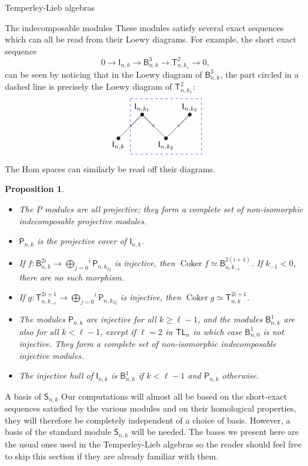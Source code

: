 \documentclass[reqno]{amsart}
\newtheorem{Prop}[Thm]{Proposition}
\newcommand{\tl}[1]{\mathsf{TL}_{#1}}
\newcommand{\ds}[1]{\mathsf S_{#1}}
\newcommand{\dl}[1]{\mathsf I_{#1}}
\newcommand{\dP}[1]{\mathsf P_{#1}}
\newcommand{\T}[2]{\mathsf{T}^{#1}_{#2}}
\newcommand{\B}[2]{\mathsf{B}^{#1}_{#2}}
\DeclareMathOperator{\Coker}{Coker}
\begin{document}
\begin{section}{Temperley-Lieb algebras}
\begin{subsection}{The indecomposable modules}
These modules satisfy several exact sequences which can all be read from their Loewy diagrams. For example, the short exact sequence
$$0 \longrightarrow \dl{n,k} \longrightarrow \B{3}{n,k} \longrightarrow \T{2}{n,k_{1}} \longrightarrow 0,$$
can be seen by noticing that in the Loewy diagram of $\B{3}{n,k}$, the part circled in a dashed line is precisely the Loewy diagram of $\T{2}{n,k_{1}}$:
\begin{equation*}
\begin{tikzpicture}[scale=1/3]
	\filldraw
			(0,0) circle (6pt) node[anchor = north] {$\dl{n,k}$}
		--	(3,3) circle (6pt) node[anchor = south] {$\dl{n,k_{1}}$}
		--	(6,0) circle (6pt) node[anchor = north] {$\dl{n,k_{2}}$}
		--	(9,3) circle (6pt) node[anchor = south] {$\dl{n,k_{3}}$};
	\draw[->] (3,3) -- (1.5,1.5);
	\draw[->] (3,3) -- (4.5,1.5);
	\draw[->] (9,3) -- (7.5,1.5);
	\draw[dashed, blue] (1.5,5) -- (10.5,5) -- (10.5,-2) -- (1.5,-2) -- (1.5,5);
\end{tikzpicture}
\end{equation*}
The Hom spaces can similarly be read off their diagrams.
\begin{Prop}\label{prop:indec.prop}
\begin{itemize}
\item The $P$ modules are all projective; they form a complete set of non-isomorphic indecomposable projective modules.
\item $\dP{n,k}$ is the projective cover of $\dl{n,k}$.
\item If $f:\B{2i}{n,k} \to \overset{i}{\underset{j=0}{\bigoplus}} \dP{n,k_{2j}} $ is injective, then $\Coker f \simeq \B{2(i+1)}{n,k_{-1}}$. If $k_{-1}<0$, there are no such morphism.
\item If $g:\T{2i+1}{n,k_{-1}} \to \overset{i}{\underset{j=0}{\bigoplus}} \dP{n,k_{2j}}$ is injective, then $\Coker g \simeq \T{2i+1}{n,k}$.
\item The modules $\dP{n,k}$ are injective for all $k\geq \ell-1$, and the modules $\B{1}{n,k}$ are also for all $k<\ell -1$, except if $\ell =2$ in $\tl{n}$ in which case $\B{1}{n,0}$ is not injective. They form a complete set of non-isomorphic indecomposable injective modules.
\item The injective hull of $\dl{n,k}$ is $\B{1}{n,k}$ if $k<\ell-1$ and $\dP{n,k}$ otherwise.
\end{itemize}
\end{Prop}
\end{subsection}
\begin{subsection}{A basis of $\ds{n,k}$}\label{sec:rappel.base.standard}
Our computations will almost all be based on the short-exact sequences satisfied by the various modules and on their homological properties, they will therefore be completely independent of a choice of basis. However, a basis of the standard module $\ds{n,k}$ will be needed. The bases we present here are the usual ones used in the Temperley-Lieb algebras so the reader should feel free to skip this section if they are already familiar with them.


\end{subsection}
\end{section}
\end{document}
